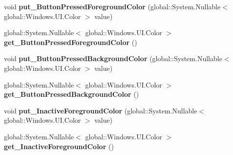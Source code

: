 \begin{DoxyCompactItemize}
\item 
\mbox{\label{class_windows_1_1_u_i_1_1_view_management_1_1_application_view_title_bar_a435e7ae01a4b3ea59a80006b81279ccb}} 
void {\bfseries put\+\_\+\+Button\+Pressed\+Foreground\+Color} (global\+::\+System.\+Nullable$<$ global\+::\+Windows.\+U\+I.\+Color $>$ value)
\item 
\mbox{\label{class_windows_1_1_u_i_1_1_view_management_1_1_application_view_title_bar_a59124291680af5093b2aa92987f61c76}} 
global\+::\+System.\+Nullable$<$ global\+::\+Windows.\+U\+I.\+Color $>$ {\bfseries get\+\_\+\+Button\+Pressed\+Foreground\+Color} ()
\item 
\mbox{\label{class_windows_1_1_u_i_1_1_view_management_1_1_application_view_title_bar_ac6b52566c45f42efc81c9a0e973afa85}} 
void {\bfseries put\+\_\+\+Button\+Pressed\+Background\+Color} (global\+::\+System.\+Nullable$<$ global\+::\+Windows.\+U\+I.\+Color $>$ value)
\item 
\mbox{\label{class_windows_1_1_u_i_1_1_view_management_1_1_application_view_title_bar_af882393a152b9df371e3781f739cabac}} 
global\+::\+System.\+Nullable$<$ global\+::\+Windows.\+U\+I.\+Color $>$ {\bfseries get\+\_\+\+Button\+Pressed\+Background\+Color} ()
\item 
\mbox{\label{class_windows_1_1_u_i_1_1_view_management_1_1_application_view_title_bar_ab42ad105c4bc400b515275e8802c38ad}} 
void {\bfseries put\+\_\+\+Inactive\+Foreground\+Color} (global\+::\+System.\+Nullable$<$ global\+::\+Windows.\+U\+I.\+Color $>$ value)
\item 
\mbox{\label{class_windows_1_1_u_i_1_1_view_management_1_1_application_view_title_bar_a5258d150c16f577f11ca52e8b41ba734}} 
global\+::\+System.\+Nullable$<$ global\+::\+Windows.\+U\+I.\+Color $>$ {\bfseries get\+\_\+\+Inactive\+Foreground\+Color} ()
\item 

\end{DoxyCompactItemize}
